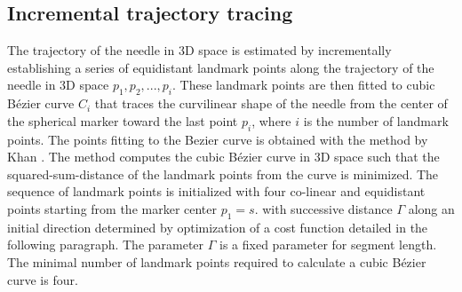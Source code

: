 \subsection{Incremental trajectory tracing} \label{inctracing}

The trajectory of the needle in 3D space is estimated by incrementally establishing a series of equidistant landmark points along the trajectory of the needle in 3D space $p_1, p_2, ..., p_i$. These landmark points are then fitted to cubic B\'ezier curve $C_i$  that traces the curvilinear shape of the needle from the center of the spherical marker toward the last point $p_i$, where $i$ is the number of landmark points. The points fitting to the Bezier curve is obtained with the method by Khan \cite{khan2007approximation}. The method computes the cubic B\'ezier curve in 3D space such that the squared-sum-distance of the landmark points from the curve is minimized. The sequence of landmark points is initialized with four co-linear and equidistant points starting from the marker center $p_1=s$. with successive distance $\Gamma$ along an initial direction determined by optimization of a cost function detailed in the following paragraph. The  parameter  $\Gamma$ is a fixed parameter for segment length. The minimal number of landmark points required to calculate a cubic B\'ezier curve is four. 


